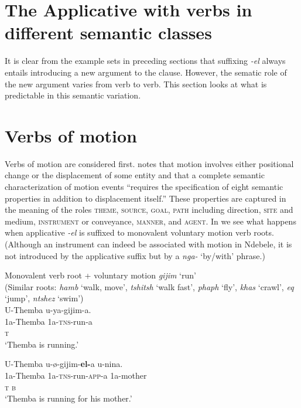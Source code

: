 \documentclass[output=paper]{langsci/langscibook}
\begin{document}
\section {The Applicative with verbs in different semantic classes}

It is clear from the example sets in preceding sections that suffixing \textit{-el} always entails introducing a new argument to the clause. However, the sematic role of the new argument varies from verb to verb. This section looks at what is predictable in this semantic variation.

\section{Verbs of motion }

Verbs of motion are considered first. \citet[171]{Frawley1992} notes that motion involves either positional change or the displacement of some entity and that a complete semantic characterization of motion events “requires the specification of eight semantic properties in addition to displacement itself.” These properties are captured in the meaning of the roles \textsc{theme}, \textsc{source}, \textsc{goal}, \textsc{path} including direction, \textsc{site} and medium, \textsc{instrument} or conveyance, \textsc{manner}, and \textsc{agent}. In  we see what happens when applicative \textit{-el} is suffixed to monovalent voluntary motion verb roots. (Although an instrument can indeed be associated with motion in Ndebele, it is not introduced by the applicative suffix but by a \textit{nga-} ‘by/with’ phrase.)

\ea
{Monovalent verb root + voluntary motion \textit{gijim }‘run’}\\
 (Similar roots: \textit{hamb} ‘walk, move’, \textit{tshitsh} ‘walk fast’, \textit{phaph} ‘fly’, \textit{khas} ‘crawl’, \textit{eq} ‘jump’, \textit{ntshez} ‘swim’)\\
\ea
\gll U-Themba u-ya-gijim-a.\\
 1a-Themba 1a-\textsc{tns}-run-a \\
 \textsc{t}\\
\glt ‘Themba is running.’

\ex
\gll U-Themba u-ø-gijim-\textbf{el-}a u-nina. \\
 1a-Themba 1a-\textsc{tns}-run-\textsc{app}-a 1a-mother\\
 \textsc{t b}\\
\glt ‘Themba is running for his mother.’ 
\end{document}
